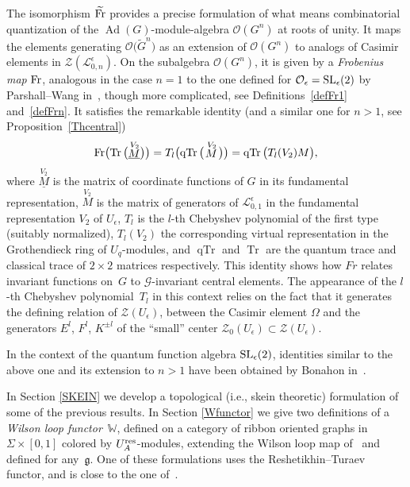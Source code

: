 \documentclass[pdftex]{sigma}%
\numberwithin{equation}{section}
\numberwithin{figure}{section}
\newcommand{\e}{\epsilon}
\newcommand{\Gg}{{\mathcal G}}
\newcommand{\Ll}{{\mathcal L}}
\begin{document}
The isomorphism $\widetilde{\rm Fr}$ provides a precise formulation of what means combinatorial quantization of the $\operatorname{Ad}(G)$-module-algebra $\mathcal{O}(G^n)$ at roots of unity. It maps the elements generating $\mathcal{O}\big(\tilde{G}^{n}\big)$ as an extension of $\mathcal{O}(G^n)$ to analogs of Casimir elements in $\mathcal{Z}(\Ll_{0,n}^\epsilon)$. On the subalgebra $\mathcal{O}(G^n)$, it is given by a {\it Frobenius map} ${\rm Fr}$, analogous in the case $n=1$ to the one defined for $\mathcal{O}_\e = {\rm SL}_\e(2)$ by Parshall--Wang in~\cite{PW}, though more complicated, see Definitions~\ref{defFr1} and~\ref{defFrn}. It satisfies the remarkable identity (and a similar one for $n>1$, see Proposition~\ref{Thcentral})
\[
{\rm Fr}\big(\!\operatorname{Tr}\big(\underline{\stackrel{V_2}{M}}\big)\big) = T_l\big(\!\operatorname{qTr}\big(\!\stackrel{V_2}{M}\!\big)\big)= \operatorname{qTr}\big({T_l(V_2)}{M}\big),
\]
where $\underline{\stackrel{V_2}{M}}$ is the matrix of coordinate functions of $G$ in its fundamental representation, $\stackrel{V_2}{M}$ is the matrix of generators of $\Ll_{0,1}^\e$ in the fundamental representation $V_2$ of $U_\e$, $T_l$ is the $l$-th Chebyshev polynomial of the first type (suitably normalized), $T_l(V_2)$ the corresponding virtual representation in the Grothendieck ring of $U_q$-modules, and $\operatorname{qTr}$ and $\operatorname{Tr}$ are the quantum trace and classical trace of $2\times 2$ matrices respectively. This identity shows how $Fr$ relates invariant functions on~$G$ to $\Gg$-invariant central elements. The appearance of the $l$-th Chebyshev polynomial~$T_l$ in this context relies on the fact that it generates the defining relation of $\mathcal{Z}(U_\e)$, between the Casimir element $\Omega$ and the generators $E^l$, $F^l$, $K^{\pm l}$ of the ``small'' center $\mathcal{Z}_0(U_\e) \subset \mathcal{Z}(U_\e)$.

In the context of the quantum function algebra ${\rm SL}_\e(2)$, identities similar to the above one and its extension to $n>1$ have been obtained by Bonahon in~\cite{Bon17}.

In Section \ref{SKEIN} we develop a topological (i.e., skein theoretic) formulation of some of the previous results.
In Section \ref{Wfunctor} we give two definitions of a {\it Wilson loop functor}~$\mathbb{W}$, defined on a category of ribbon oriented graphs in $\Sigma \times [0,1]$ colored by $U_A^{\rm res}$-modules, extending the Wilson loop map of~\cite{BR2} and defined for any~$\mathfrak{g}$. One of these formulations uses the Reshetikhin--Turaev functor, and is close to the one of~\cite{BFK}.
\end{document}
